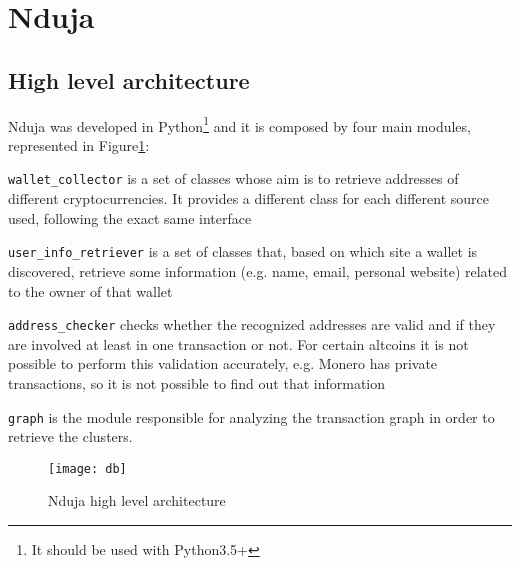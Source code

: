\newcommand{\walletcollector}{\texttt{wallet\_collector}}
\newcommand{\userinforetriever}{\texttt{user\_info\_retriever}}
\newcommand{\addresschecker}{\texttt{address\_checker}}
\newcommand{\graph}{\texttt{graph}}

\section{Nduja} \label{nduja}
\subsection{High level architecture}
Nduja was developed in Python\footnote{It should be used with Python3.5+} and it
is composed by four main modules, represented in Figure\ref{fig:architecture}:
\begin{enumerate*}[label=\roman*),itemjoin={,\quad}]
\item \walletcollector{} is a set of classes whose aim is to retrieve
addresses of different cryptocurrencies. It provides a different class for each
different source used, following the exact same interface
\item \userinforetriever{} is a set of classes that, based on which
site a wallet is discovered, retrieve some information (e.g. name, email,
personal website) related to the owner of that wallet
\item \addresschecker{} checks whether the recognized addresses are valid and if
they are involved at least in one transaction or not. For certain
altcoins it is not possible to perform this validation accurately, e.g.
Monero has private transactions, so it is not possible to find out that
information
\item \graph{} is the module responsible for analyzing the transaction graph
in order to retrieve the clusters.
\end{enumerate*}

\begin{figure}
\centering
\texttt{[image: db]}
\caption{Nduja high level architecture}
\label{fig:architecture}
\end{figure}

